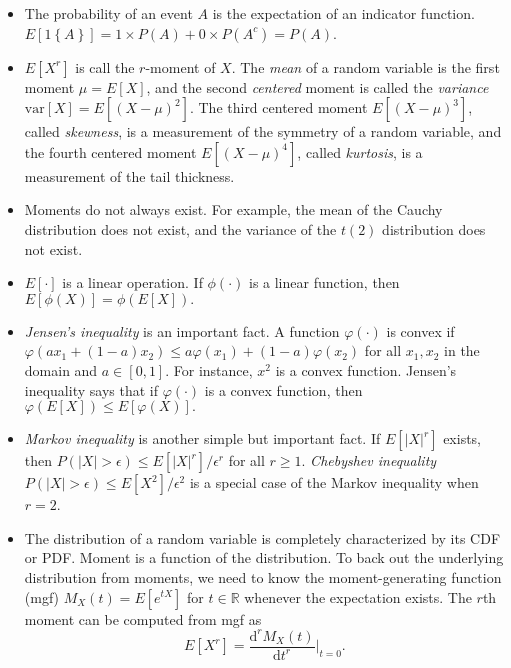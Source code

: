 \documentclass[11pt]{article}
\begin{document}
\begin{itemize}
\item
  The probability of an event \(A\) is the expectation of an indicator
  function.
  \(E\left[1\left\{ A\right\} \right]= 1\times P(A) + 0 \times P(A^c) =P\left(A\right)\).
\item
  \(E\left[X^{r}\right]\) is call the \(r\)-moment of \(X\). The
  \emph{mean} of a random variable is the first moment
  \(\mu=E\left[X\right]\), and the second \emph{centered} moment is
  called the \emph{variance}
  \(\mathrm{var}\left[X\right]=E\left[\left(X-\mu\right)^{2}\right]\).
  The third centered moment \(E\left[\left(X-\mu\right)^{3}\right]\),
  called \emph{skewness}, is a measurement of the symmetry of a random
  variable, and the fourth centered moment
  \(E\left[\left(X-\mu\right)^{4}\right]\), called \emph{kurtosis}, is a
  measurement of the tail thickness.
\item
  Moments do not always exist. For example, the mean of the Cauchy
  distribution does not exist, and the variance of the \(t(2)\)
  distribution does not exist.
\item
  \(E[\cdot]\) is a linear operation. If \(\phi(\cdot)\) is a linear
  function, then \(E[\phi(X)] = \phi(E[X]).\)
\item
  \emph{Jensen's inequality} is an important fact. A function
  \(\varphi(\cdot)\) is convex if
  \(\varphi( a x_1 + (1-a) x_2 ) \leq a \varphi(x_1) + (1-a) \varphi(x_2)\)
  for all \(x_1,x_2\) in the domain and \(a\in[0,1]\). For instance,
  \(x^2\) is a convex function. Jensen's inequality says that if
  \(\varphi\left(\cdot\right)\) is a convex function, then
  \(\varphi\left(E\left[X\right]\right)\leq E\left[\varphi\left(X\right)\right].\)
\item
  \emph{Markov inequality} is another simple but important fact. If
  \(E\left[\left|X\right|^{r}\right]\) exists, then
  \(P\left(\left|X\right|>\epsilon\right)\leq E\left[\left|X\right|^{r}\right]/\epsilon^{r}\)
  for all \(r\geq1\). \emph{Chebyshev inequality}
  \(P\left(\left|X\right|>\epsilon\right)\leq E\left[X^{2}\right]/\epsilon^{2}\)
  is a special case of the Markov inequality when \(r=2\).
\item
  The distribution of a random variable is completely characterized by
  its CDF or PDF. Moment is a function of the distribution. To back out
  the underlying distribution from moments, we need to know the
  moment-generating function (mgf) \(M_X(t) = E [ e^{tX}]\) for
  \(t\in \mathbb{R}\) whenever the expectation exists. The \(r\)th
  moment can be computed from mgf as \[
  E[X^r ] = \frac{ \mathrm{d}^r M_X(t) }{ \mathrm{d} t^r } \big \vert_{t=0}.
  \]
\end{itemize}
\end{document}
